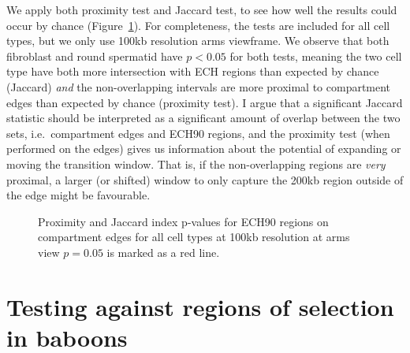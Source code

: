 \documentclass[
  11pt,
  a4paper,
]{scrbook}
\let\oldemph\emph
\renewcommand\emph[1]{\oldemph{\color{gray}#1}}
\begin{document}
We apply both proximity test and Jaccard test, to see how well the
results could occur by chance (Figure~\ref{fig-proximity-jaccard-bar}).
For completeness, the tests are included for all cell types, but we only
use 100kb resolution arms viewframe. We observe that both fibroblast and
round spermatid have \(p < 0.05\) for both tests, meaning the two cell
type have both more intersection with ECH regions than expected by
chance (Jaccard) \emph{and} the non-overlapping intervals are more
proximal to compartment edges than expected by chance (proximity test).
I argue that a significant Jaccard statistic should be interpreted as a
significant amount of overlap between the two sets, i.e.~compartment
edges and ECH90 regions, and the proximity test (when performed on the
edges) gives us information about the potential of expanding or moving
the transition window. That is, if the non-overlapping regions are
\emph{very} proximal, a larger (or shifted) window to only capture the
200kb region outside of the edge might be favourable.

\begin{figure}[H]


\caption{\label{fig-proximity-jaccard-bar}Proximity and Jaccard index
p-values for ECH90 regions on compartment edges for all cell types at
100kb resolution at arms view \(p=0.05\) is marked as a red line.}

\end{figure}%

\section{Testing against regions of selection in
baboons}\label{testing-against-regions-of-selection-in-baboons}
\end{document}
